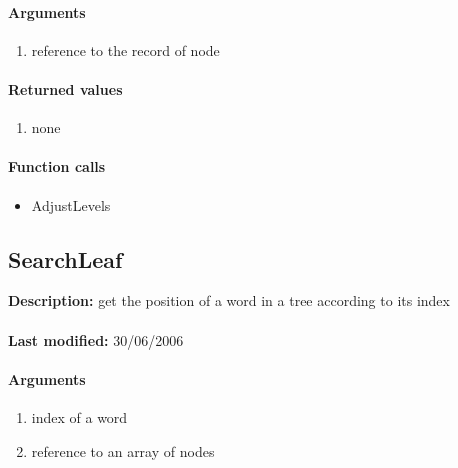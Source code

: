 \paragraph{Arguments}
\begin{enumerate}
\item reference to the record of node
\end{enumerate}

\paragraph{Returned values}
\begin{enumerate}
\item none
\end{enumerate}

\paragraph{Function calls}
\begin{itemize}
\item AdjustLevels
\end{itemize}

\subsection{SearchLeaf}
\textbf{Description:} get the position of a word in a tree according to its index\\
\\\textbf{Last modified:} 30/06/2006

\paragraph{Arguments}
\begin{enumerate}
\item index of a word
\item reference to an array of nodes
\end{enumerate}

